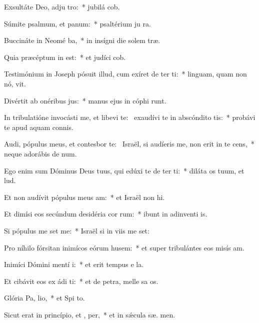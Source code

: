 \item Exsultáte Deo, adju tro:~* jubilá  cob.
\item Súmite psalmum, et  panum:~* psaltérium ju  ra.
\item Buccináte in Neomé ba,~* in insígni die solem træ.
\item Quia præcéptum in  est:~* et judíci  cob.
\item Testimónium in Joseph pósuit illud, cum exíret de ter ti:~* linguam, quam non nó, vit.
\item Divértit ab onéribus  jus:~* manus ejus in cóphi runt.
\item In tribulatióne invocásti me, et libevi te:~\pscross{} exaudívi te in abscóndito tis:~* probávi te apud aquam connis.
\item Audi, pópulus meus, et contesbor te:~\pscross{} Israël, si audíeris me, non erit in te  cens,~* neque adorábis de num.
\item Ego enim sum Dóminus Deus tuus, qui edúxi te de ter ti:~* diláta os tuum, et  lud.
\item Et non audívit pópulus meus  am:~* et Israël non  hi.
\item Et dimísi eos secúndum desidéria cor rum:~* ibunt in adinventi is.
\item Si pópulus me set me:~* Israël si in viis me set:
\item Pro níhilo fórsitan inimícos eórum husem:~* et super tribulántes eos misís  am.
\item Inimíci Dómini mentí  i:~* et erit tempus e  la.
\item Et cibávit eos ex ádi ti:~* et de petra, melle sa os.
\item Glória Pa,  lio,~* et Spi to.
\item Sicut erat in princípio, et ,  per,~* et in sǽcula sæ. men.
